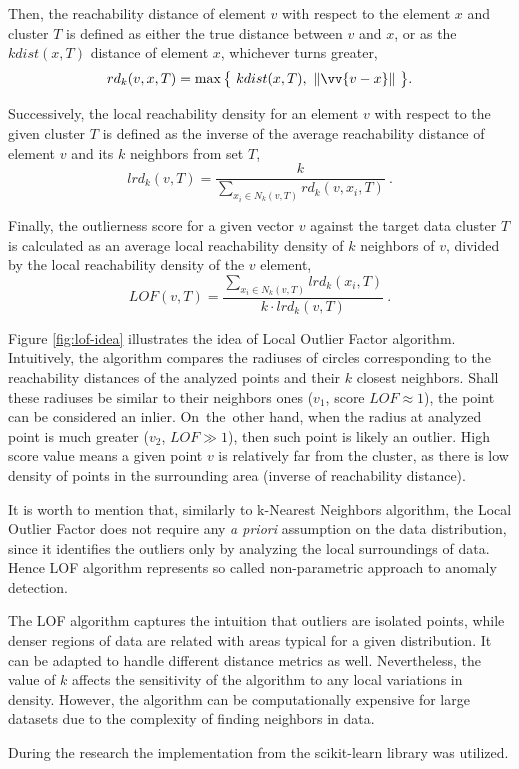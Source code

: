 Then, the reachability distance of element $v$ with respect to the element $x$ and cluster $T$ is defined as either the true distance between $v$ and $x$, or as the $kdist(x, T)$ distance of element $x$, whichever turns greater,
\begin{equation}
    rd_k(v, x, T)
    =
    \max\big\{
        ~
        kdist(x, T),
        ~
        \norm{\vv{v - x}}
        ~
    \big\}
    .
\end{equation}

Successively, the local reachability density for an element $v$ with respect to the given cluster $T$ is defined as the inverse of the average reachability distance of element $v$ and its $k$ neighbors from set $T$,
\begin{equation}
    lrd_k(v, T)
    =
    \frac{
        k
    }{
        \sum_{x_i \in N_k(v, T)} rd_k(v, x_i, T)
    }
    ~.
\end{equation}

Finally, the outlierness score for a given vector $v$ against the target data cluster $T$ is calculated as an average local reachability density of $k$ neighbors of $v$, divided by the local reachability density of the $v$ element,
\begin{equation}
    LOF(v, T)
    =
    \frac{
        \sum_{x_i \in N_k(v, T)} lrd_k(x_i, T)
    }{
        k \cdot lrd_k(v, T)
    }
    ~.
\end{equation}

Figure \ref{fig:lof-idea} illustrates the idea of Local Outlier Factor algorithm. Intuitively, the algorithm compares the radiuses of circles corresponding to the reachability distances of the analyzed points and their $k$ closest neighbors. Shall these radiuses be similar to their neighbors ones ($v_1$, score $LOF \approx 1$), the point can be considered an inlier. On~the~other hand, when the radius at analyzed point is much greater ($v_2$, $LOF \gg 1$), then such point is likely an outlier. High score value means a given point $v$ is relatively far from the cluster, as there is low density of points in the surrounding area (inverse of reachability distance).

It is worth to mention that, similarly to k-Nearest Neighbors algorithm, the Local Outlier Factor does not require any \textit{a priori} assumption on the data distribution, since it identifies the outliers only by analyzing the local surroundings of data. Hence LOF algorithm represents so called non-parametric approach to anomaly detection.

The LOF algorithm captures the intuition that outliers are isolated points, while denser regions of data are related with areas typical for a given distribution. It can be adapted to handle different distance metrics as well. Nevertheless, the value of $k$ affects the sensitivity of the algorithm to any local variations in density. However, the algorithm can be computationally expensive for large datasets due to the complexity of finding neighbors in data.

During the research the implementation from the scikit-learn library \cite{scikit-learn} was utilized.
